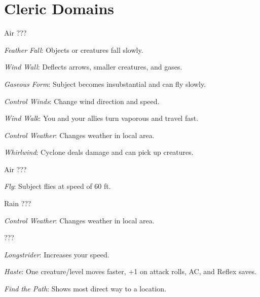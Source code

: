 \section{Cleric Domains}

{Air}
{???}
{
	\item \textit{Feather Fall}: Objects or creatures fall slowly.
	\item \textit{Wind Wall}: Deflects arrows, smaller creatures, and gases.
	\item \textit{Gaseous Form}: Subject becomes insubstantial and can fly slowly.
	\item 
	\item \textit{Control Winds}: Change wind direction and speed.
	\item \textit{Wind Walk}: You and your allies turn vaporous and travel fast.
	\item \textit{Control Weather}: Changes weather in local area.
	\item 
	\item \textit{Whirlwind}: Cyclone deals damage and can pick up creatures.
}

{Air}
{???}
{
	\item 
	\item 
	\item 
	\item \textit{Fly}: Subject flies at speed of 60 ft.
	\item 
	\item 
	\item 
	\item 
	\item 
}

{Rain}
{???}
{
	\item 
	\item 
	\item 
	\item 
	\item 
	\item 
	\item \textit{Control Weather}: Changes weather in local area.
	\item 
	\item 
}

{}
{???}
{
	\item \textit{Longstrider}: Increases your speed.
	\item 
	\item 
	\item \textit{Haste}: One creature/level moves faster, +1 on attack rolls, AC, and Reflex saves.
	\item 
	\item \textit{Find the Path}: Shows most direct way to a location.
	\item 
	\item 
	\item 
}